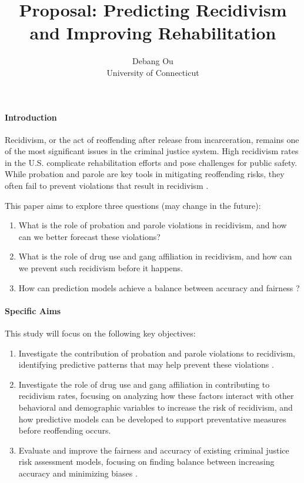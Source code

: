 \documentclass[12pt]{article}
\title{Proposal: Predicting Recidivism and Improving Rehabilitation}
\author{Debang Ou\\
  University of Connecticut
}
\begin{document}
\maketitle
\paragraph{Introduction}
Recidivism, or the act of reoffending after release from incarceration, remains one of the most significant issues in the criminal justice system. High recidivism rates in the U.S. complicate rehabilitation efforts and pose challenges for public safety. While probation and parole are key tools in mitigating reoffending risks, they often fail to prevent violations that result in recidivism \citep{kaeble2020probation}.

This paper aims to explore three questions (may change in the future):
\begin{enumerate}
    \item What is the role of probation and parole violations in recidivism, and how can we better forecast these violations?
    \item What is the role of drug use and gang affiliation in recidivism, and how can we prevent such recidivism before it happens.
    \item How can prediction models achieve a balance between accuracy and fairness \citep{berk2020acceptable}?
\end{enumerate}


\paragraph{Specific Aims}
This study will focus on the following key objectives:
\begin{enumerate}
    \item Investigate the contribution of probation and parole violations to recidivism, identifying predictive patterns that may help prevent these violations \citep{kaeble2020probation}.
    \item Investigate the role of drug use and gang affiliation in contributing to recidivism rates, focusing on analyzing how these factors interact with other behavioral and demographic variables to increase the risk of recidivism, and how predictive models can be developed to support preventative measures before reoffending occurs.
    \item Evaluate and improve the fairness and accuracy of existing criminal justice risk assessment models, focusing on finding balance between increasing accuracy and minimizing biases \citep{berk2020acceptable}.
\end{enumerate}
\end{document}
